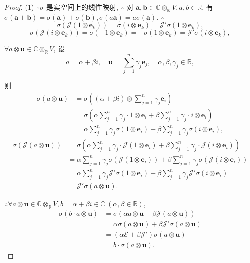 \documentclass[color=black,device=normal,lang=cn,mode=geye]{elegantnote}
\begin{document}
\begin{proof}
    (1) $\because\sigma$ 是实空间上的线性映射, $\therefore$ 对 $\boldsymbol{a},\boldsymbol{b}\in\mathbb{C}\otimes_\mathbb{R}V,a,b\in\mathbb{R}$, 有 $\sigma(\boldsymbol{a}+\boldsymbol{b})=\sigma(\boldsymbol{a})+\sigma(\boldsymbol{b}),\sigma(a\boldsymbol{a})=a\sigma(\boldsymbol{a})$. $\therefore$
    \[\sigma(\mathcal{J}(1\otimes\boldsymbol{e}_k))=\sigma(i\otimes\boldsymbol{e}_k)=\mathcal{J}'\sigma(1\otimes\boldsymbol{e}_k),\]
    \[\sigma(\mathcal{J}(i\otimes\boldsymbol{e}_k))=\sigma(-1\otimes\boldsymbol{e}_k)=-\sigma(1\otimes\boldsymbol{e}_k)=\mathcal{J}'\sigma(i\otimes\boldsymbol{e}_k),\]

    $\forall a\otimes\boldsymbol{u}\in\mathbb{C}\otimes_\mathbb{R}V$, 设
    \[a=\alpha+\beta i,\quad\boldsymbol{u}=\sum\limits_{j=1}^n\gamma_j\boldsymbol{e}_j,\quad\alpha,\beta,\gamma_j\in\mathbb{R},\]

    则
    \begin{align*}
        \sigma(a\otimes\boldsymbol{u}) & =\sigma\left((\alpha+\beta i)\otimes\sum\limits_{j=1}^n\gamma_j\boldsymbol{e}_i\right) \\
        & =\sigma\left(\alpha\sum\limits_{j=1}^n\gamma_j\cdot1\otimes\boldsymbol{e}_i+\beta\sum\limits_{j=1}^n\gamma_j\cdot i\otimes\boldsymbol{e}_i\right) \\
        & =\alpha\sum\limits_{j=1}^n\gamma_j\sigma\left(1\otimes\boldsymbol{e}_i\right)+\beta\sum\limits_{j=1}^n\gamma_j\sigma\left(i\otimes\boldsymbol{e}_i\right),
    \end{align*}
    \begin{align*}
        \sigma(\mathcal{J}(a\otimes\boldsymbol{u})) & =\sigma\left(\alpha\sum\limits_{j=1}^n\gamma_j\cdot\mathcal{J}(1\otimes\boldsymbol{e}_i)+\beta\sum\limits_{j=1}^n\gamma_j\cdot\mathcal{J}(i\otimes\boldsymbol{e}_i)\right) \\
        & =\alpha\sum\limits_{j=1}^n\gamma_j\sigma(\mathcal{J}(1\otimes\boldsymbol{e}_i))+\beta\sum\limits_{j=1}^n\gamma_j\sigma(\mathcal{J}(i\otimes\boldsymbol{e}_i)) \\
        & =\alpha\sum\limits_{j=1}^n\gamma_j\mathcal{J}'\sigma(1\otimes\boldsymbol{e}_i)+\beta\sum\limits_{j=1}^n\gamma_j\mathcal{J}'\sigma(i\otimes\boldsymbol{e}_i) \\
        & =\mathcal{J}'\sigma(a\otimes\boldsymbol{u}).
    \end{align*}

    $\therefore\forall a\otimes\boldsymbol{u}\in\mathbb{C}\otimes_\mathbb{R}V,b=\alpha+\beta i\in\mathbb{C}\ (\alpha,\beta\in\mathbb{R})$,
    \begin{align*}
        \sigma(b\cdot a\otimes\boldsymbol{u}) & =\sigma(\alpha a\otimes\boldsymbol{u}+\beta\mathcal{J}(a\otimes\boldsymbol{u})) \\
        & =\alpha\sigma(a\otimes\boldsymbol{u})+\beta\mathcal{J}'\sigma(a\otimes\boldsymbol{u}) \\
        & =(\alpha\mathcal{E}+\beta\mathcal{J}')\sigma(a\otimes\boldsymbol{u}) \\
        & =b\cdot\sigma(a\otimes\boldsymbol{u}).
    \end{align*}


\end{proof}
\end{document}

